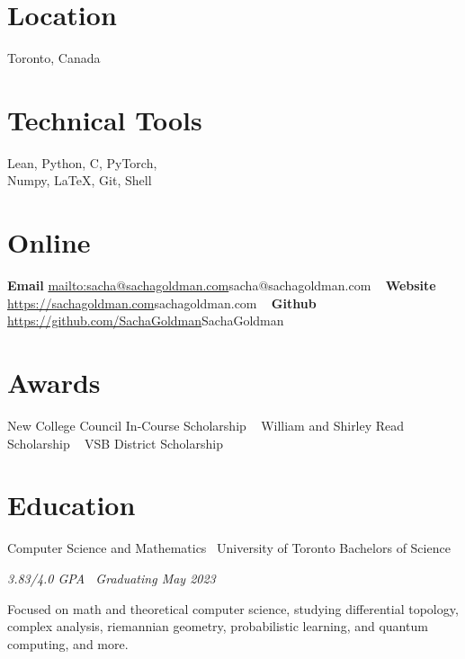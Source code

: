 \documentclass[]{style}
\begin{document}

\begin{aside} %
\section{Location}
Toronto, Canada
\section{Technical Tools}
Lean, Python, C, PyTorch, \\ Numpy, \LaTeX, Git, Shell
\section{Online}
\textbf{Email}
\url{mailto:sacha@sachagoldman.com}{sacha@sachagoldman.com} 
~ \vspace{-2mm}
\textbf{Website} 
\url{https://sachagoldman.com}{sachagoldman.com} 
~ \vspace{-2mm}
\textbf{Github}
\url{https://github.com/SachaGoldman}{SachaGoldman}
\section{Awards}
New College Council 
In-Course Scholarship
~ \vspace{-1mm}
William and Shirley Read 
Scholarship
~ \vspace{-1mm}
VSB District Scholarship
\end{aside}

\section{Education}

\begin{entrylist}

\entry
{Computer Science and Mathematics \ {\normalfont University of Toronto}}
{Bachelors of Science}
{\emph{3.83/4.0 GPA \ Graduating May 2023}
~ \vspace{1mm}

Focused on math and theoretical computer science, studying differential topology, complex analysis, riemannian geometry, probabilistic learning, and quantum computing, and more.}

\end{entrylist}
\end{document}
